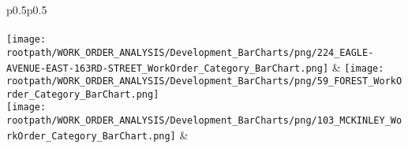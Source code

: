 \begin{center}
                                \tablehead{\hspace{1cm}\\}
                                \tabletail{\hspace{1cm}\\}
                                \begin{supertabular}{p{0.5\textwidth}p{0.5\textwidth}}
                                 \\
                                 \\
                                \texttt{[image: \\rootpath/WORK\_ORDER\_ANALYSIS/Development\_BarCharts/png/224\_EAGLE-AVENUE-EAST-163RD-STREET\_WorkOrder\_Category\_BarChart.png]} & \texttt{[image: \\rootpath/WORK\_ORDER\_ANALYSIS/Development\_BarCharts/png/59\_FOREST\_WorkOrder\_Category\_BarChart.png]} \\
                                        \texttt{[image: \\rootpath/WORK\_ORDER\_ANALYSIS/Development\_BarCharts/png/103\_MCKINLEY\_WorkOrder\_Category\_BarChart.png]} &  \hspace{1cm} \\
                                        \end{supertabular}
\end{center}

